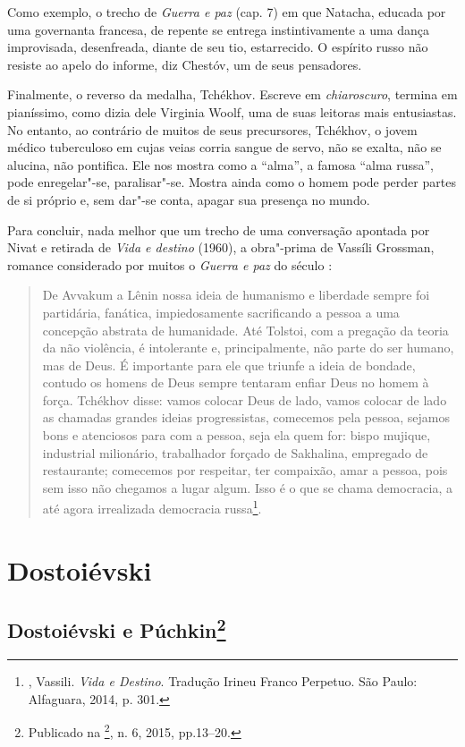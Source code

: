Como exemplo, o trecho de \emph{Guerra e paz} (cap. 7) em que Natacha, educada por uma governanta francesa, de repente se entrega
instintivamente a uma dança improvisada, desenfreada, diante de seu tio, estarrecido. O espírito russo não resiste ao apelo do informe, diz Chestóv, um de seus pensadores.

Finalmente, o reverso da medalha, Tchékhov. Escreve em \emph{chiaroscuro}, termina em pianíssimo, como dizia dele Virginia
Woolf, uma de suas leitoras mais entusiastas. No entanto, ao contrário de muitos de seus precursores, Tchékhov, o jovem médico tuberculoso em cujas veias corria sangue de servo, não se exalta, não se alucina, não pontifica. Ele nos mostra como a ``alma'', a famosa ``alma russa'', pode enregelar"-se, paralisar"-se. Mostra ainda como o homem pode perder partes de si próprio e, sem dar"-se conta, apagar sua presença no mundo.

Para concluir, nada melhor que um trecho de uma conversação apontada por Nivat e retirada de \emph{Vida e destino} (1960), a obra"-prima de Vassíli Grossman, romance considerado por muitos o \emph{Guerra e paz} do século :

\begin{quote}
De Avvakum a Lênin nossa ideia de humanismo e liberdade sempre foi partidária, fanática, impiedosamente sacrificando a pessoa a uma concepção abstrata de humanidade. Até Tolstoi, com a pregação da teoria da não violência, é intolerante e, principalmente, não parte do ser humano, mas de Deus. É importante para ele que triunfe a ideia de bondade, contudo os homens de Deus sempre tentaram enfiar Deus no homem à força. Tchékhov disse: vamos colocar Deus de lado, vamos colocar de
lado as chamadas grandes ideias progressistas, comecemos pela pessoa, sejamos bons e atenciosos para com a pessoa, seja ela quem for: bispo mujique, industrial milionário, trabalhador forçado de Sakhalina, empregado de restaurante; comecemos por respeitar, ter compaixão, amar a pessoa, pois sem isso não chegamos a lugar algum. Isso é o que se chama democracia, a até agora irrealizada democracia russa\footnote{, Vassili. \emph{Vida e Destino}. Tradução Irineu Franco Perpetuo. São Paulo: Alfaguara, 2014, p. 301.}.
\end{quote}


\part{Dostoiévski}

\chapter{Dostoiévski e Púchkin\footnote{Publicado na \footnote{Revista Rus}, n. 6, 2015, pp.13--20.}}

